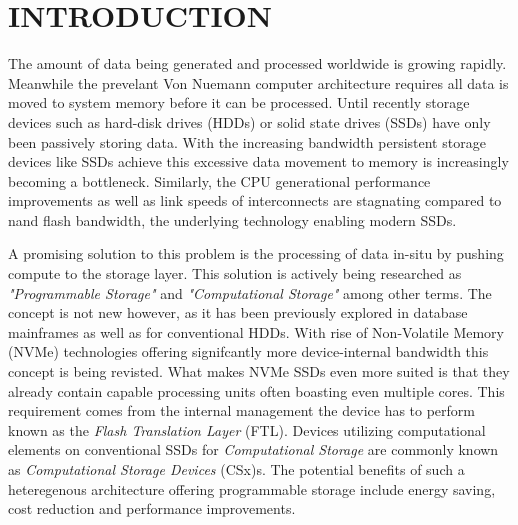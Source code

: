\documentclass[conference]{IEEEtran}
\begin{document}
\clearpage
\onecolumn

\hypersetup{
	linkcolor=black
}

\renewcommand{\contentsname}{CONTENTS}
\tableofcontents{}

\hypersetup{
	linkcolor=blue
}

\twocolumn

\section*{INTRODUCTION}


The amount of data being generated and processed worldwide is growing rapidly.
Meanwhile the prevelant Von Nuemann computer architecture requires all data is 
moved to system memory before it can be processed\cite{2018-neumann-bottleneck}.
Until recently storage devices such as hard-disk drives (HDDs) or solid state
drives (SSDs) have only been passively storing data. With the increasing
bandwidth persistent storage devices like SSDs achieve this excessive data
movement to memory is increasingly becoming a bottleneck\cite{2014-micro-ndp}.
Similarly, the CPU generational performance
improvements\cite{2016-western-digital} as well as link speeds of interconnects
are stagnating compared to nand flash bandwidth\cite{10.1145/3286588}, the
underlying technology enabling modern SSDs.


A promising solution to this problem is the processing of data in-situ by
pushing compute to the storage layer. This solution is actively being researched
as \textit{"Programmable Storage"} and \textit{"Computational Storage"} among
other terms. The concept is not new however, as it has been previously
explored in database mainframes\cite{database-computer} as well as for
conventional HDDs\cite{active-disk-pillar, active-disks-tech, intelligent-disk}.
With rise of Non-Volatile Memory (NVMe) technologies offering signifcantly more 
device-internal bandwidth this concept is being revisted. What makes NVMe SSDs
even more suited is that they already contain capable processing units often
boasting even multiple cores. This requirement comes from the internal
management the device has to perform known as the
\textit{Flash Translation Layer} (FTL). Devices utilizing computational elements
on conventional SSDs for \textit{Computational Storage} are commonly known as
\textit{Computational Storage Devices} (CSx)s. The potential benefits of such a
heteregenous architecture offering programmable storage include energy saving,
cost reduction and performance improvements.
\end{document}
